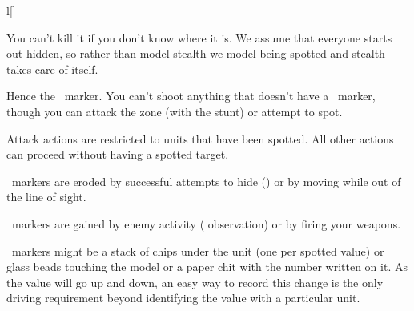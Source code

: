 \begin{wrapfigure}[22]{l}[\sidebarwidth]{\halfbarwidth}
\begin{shadebox}[SPOTTED]{\halfbarinnerwidth}
You can't kill it if you don't know where it is. We assume that everyone starts out hidden, so rather than model stealth we model being spotted and stealth takes care of itself.

Hence the \SPOTTED\ marker. You can't shoot anything that doesn't have a \SPOTTED\ marker, though you can attack the zone (with the  stunt) or attempt to spot.

Attack actions are restricted to units that have been spotted. All other actions can proceed without having a spotted target.

\SPOTTED\ markers are eroded by successful attempts to hide () or by moving while out of the line of sight.

\SPOTTED\ markers are gained by enemy activity ( observation) or by firing your weapons.

\SPOTTED\ markers might be a stack of chips under the unit (one per spotted value) or glass beads touching the model or a paper chit with the number written on it. As the value will go up and down, an easy way to record this change is the only driving requirement beyond identifying the value with a particular unit.
\end{shadebox}
\end{wrapfigure}

